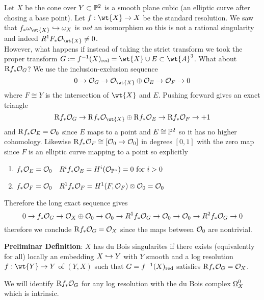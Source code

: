 \documentclass[12pt]{article}
\newcommand{\R}{\mathrm{R}}
\begin{document}
\begin{example}
Let $X$ be the cone over $Y \subset \P^2$ is a smooth plane cubic (an elliptic curve after chosing a base point). Let $f : \wt{X} \to X$ be the standard resolution. We saw that $f_* \omega_{\wt{X}} \embed \omega_X$ is \textit{not} an isomorphism so this is not a rational singularity and indeed $R^1 F_* \struct{\wt{X}} \neq 0$. 
\bigskip\\
However, what happens if instead of taking the strict transform we took the proper transform $G := f^{-1}(X)_{\red} = \wt{X} \cup E \subset \wt{A}^3$. What about $\R f_* \struct{G}$? We use the inclusion-exclusion sequence
\[ 0 \to \struct{G} \to \struct{\wt{X}} \oplus \struct{E} \to \struct{F} \to 0 \]
where $F \cong Y$ is the intersection of $\wt{X}$ and $E$. Pushing forward gives an exact triangle
\[ \R f_* \struct{G} \to \R f_* \struct{\wt{X}} \oplus \R f_* \struct{E} \to \R f_* \struct{F} \to + 1 \]
and $\R f_* \struct{E} = \struct{0}$ since $E$ maps to a point and $E \cong \P^2$ so it has no higher cohomology. Likewise $\R f_* \struct{F} \cong [ \struct{0} \to \struct{0}]$ in degrees $[0,1]$ with the zero map since $F$ is an elliptic curve mapping to a point so explicitly
\begin{enumerate}
\item $f_* \struct{E} = \struct{0} \quad R^i f_* \struct{E} = H^i(\struct{\P^n}) = 0 \text{ for } i > 0$
\item $f_* \struct{F} = \struct{0} \quad R^1 f_* \struct{F} = H^1(F, \struct{F}) \ot \struct{0} = \struct{0}$ 
\end{enumerate}
Therefore the long exact sequence gives
\[ 0 \to f_* \struct{G} \to \struct{X} \oplus \struct{0} \to \struct{0} \to R^1 f_* \struct{G} \to \struct{0} \to \struct{0} \to R^2 f_* \struct{G} \to 0 \]
therefore we conclude $\R f_* \struct{G} = \struct{X}$ since the maps between $\struct{0}$ are nontrivial. 
\end{example}

\textbf{Preliminar Definition}: $X$ has du Bois singularites if there exists (equivalently for all) locally an embedding $X \embed Y$ with $Y$ smooth and a log resolution $f : \wt{Y} \to Y$ of $(Y, X)$ such that $G = f^{-1}(X)_{\red}$ satisfies $\R f_* \struct{G} = \struct{X}$.  

\begin{rmk}
We will identify $\R f_* \struct{G}$ for any log resolution with the du Bois complex $\ul{\Omega}^0_X$ which is intrinsic.  
\end{rmk}
\end{document}

